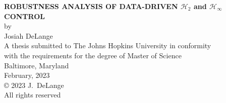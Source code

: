 \thispagestyle{empty}
\baselineskip=18pt
\begin{center}
\vspace*{3\baselineskip}
%
{\bfseries ROBUSTNESS ANALYSIS OF DATA-DRIVEN $\mathcal{H}_{2}$ and $\mathcal{H}_{\infty}$ CONTROL}\\[4\baselineskip]
%
by\\
%
Josiah DeLange\\[3\baselineskip]
%
%
A thesis submitted to The Johns Hopkins University in conformity \\ 
with the requirements for the degree of Master of Science\\[3\baselineskip]
%
Baltimore, Maryland\\
February, 2023\\[6\baselineskip]
%

{\copyright{} 2023 J.~DeLange\\
All rights reserved}
%
\end{center}
%
\baselineskip=24pt
\newpage 